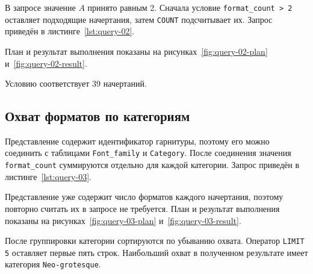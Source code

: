 В запросе значение $A$ принято равным 2. Сначала условие
\texttt{format_count > 2} оставляет подходящие начертания, затем
\texttt{COUNT} подсчитывает их. Запрос приведён в
листинге~\ref{lst:query-02}.


План и результат выполнения показаны на
рисунках~\ref{fig:query-02-plan} и~\ref{fig:query-02-result}.



Условию соответствует 39 начертаний.

\subsection{Охват форматов по категориям}

Представление содержит идентификатор гарнитуры, поэтому его можно соединить с
таблицами \texttt{Font_family} и \texttt{Category}. После
соединения значения \texttt{format_count} суммируются отдельно для
каждой категории. Запрос приведён в листинге~\ref{lst:query-03}.


Представление уже содержит число форматов каждого начертания, поэтому повторно
считать их в запросе не требуется. План и результат выполнения показаны на
рисунках~\ref{fig:query-03-plan} и~\ref{fig:query-03-result}.



После группировки категории сортируются по убыванию охвата. Оператор
\texttt{LIMIT 5} оставляет первые пять строк. Наибольший охват в
полученном результате имеет категория \texttt{Neo-grotesque}.

